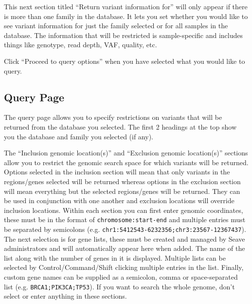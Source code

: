 \documentclass[11pt, a4paper]{article}
\begin{document}
This next section titled ``Return variant information for'' will only appear if there is more than one family in the database. It lets you set whether you would like to see variant information for just the family selected or for all samples in the database. The information that will be restricted is sample-specific and includes things like genotype, read depth, VAF, quality, etc.

Click ``Proceed to query options'' when you have selected what you would like to query.

\subsection{Query Page}

The query page allows you to specify restrictions on variants that will be returned from the database you selected. The first 2 headings at the top show you the database and family you selected (if any).

The ``Inclusion genomic location(s)'' and ``Exclusion genomic location(s)'' sections allow you to restrict the genomic search space for which variants will be returned. Options selected in the inclusion section will mean that only variants in the regions/genes selected will be returned whereas options in the exclusion section will mean everything but the selected regions/genes will be returned. They can be used in conjunction with one another and exclusion locations will override inclusion locations. Within each section you can first enter genomic coordinates, these must be in the format of \texttt{chromosome:start-end} and multiple entries must be separated by semicolons (e.g. \texttt{chr1:5412543-6232356;chr3:23567-12367437}). The next selection is for gene lists, these must be created and managed by Seave administrators and will automatically appear here when added. The name of the list along with the number of genes in it is displayed. Multiple lists can be selected by Control/Command/Shift clicking multiple entries in the list. Finally, custom gene names can be supplied as a semicolon, comma or space-separated list (e.g. \texttt{BRCA1;PIK3CA;TP53}). If you want to search the whole genome, don't select or enter anything in these sections.
\end{document}
